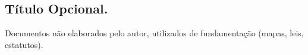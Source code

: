 \begin{anexosenv}
\chapter{Título Opcional.}
Documentos não elaborados pelo autor, utilizados de fundamentação (mapas, leis, estatutos).
\end{anexosenv}
